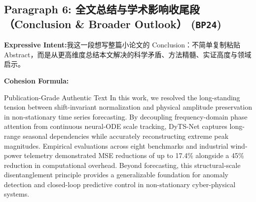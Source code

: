 \subsection*{Paragraph 6: 全文总结与学术影响收尾段（Conclusion \& Broader Outlook） (\texttt{BP24})}
\noindent\textbf{Expressive Intent:}\enspace 我这一段想写整篇小论文的 Conclusion：不简单复制粘贴 Abstract，而是从更高维度总结本文解决的科学矛盾、方法精髓、实证高度与领域启示。\par
\noindent\textbf{Cohesion Formula:}\par\vspace{4pt}
\begin{ExampleBox}{Publication-Grade Authentic Text}
In this work, we resolved the long-standing tension between shift-invariant normalization and physical amplitude preservation in non-stationary time series forecasting. By decoupling frequency-domain phase attention from continuous neural-ODE scale tracking, DyTS-Net captures long-range seasonal dependencies while accurately reconstructing extreme peak magnitudes. Empirical evaluations across eight benchmarks and industrial wind-power telemetry demonstrated MSE reductions of up to 17.4\% alongside a 45\% reduction in computational overhead. Beyond forecasting, this structural-scale disentanglement principle provides a generalizable foundation for anomaly detection and closed-loop predictive control in non-stationary cyber-physical systems.
\end{ExampleBox}
